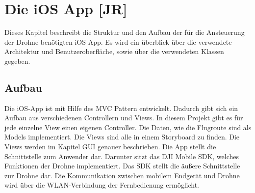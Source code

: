 
\chapter{Die iOS App [JR]}\label{cha:iOS App}

Dieses Kapitel beschreibt die Struktur und den Aufbau der für die Ansteuerung der Drohne benötigten iOS App. Es wird ein überblick über die verwendete Architektur und Benutzeroberfläche, sowie über die verwendeten Klassen gegeben.

\section{Aufbau}
Die iOS-App ist mit Hilfe des \acs{MVC} Pattern entwickelt. Dadurch gibt sich ein Aufbau aus verschiedenen Controllern und Views. In diesem Projekt gibt es für jede einzelne View einen eigenen Controller. Die Daten, wie die Flugroute sind als Models implementiert. 
\newline
Die Views sind alle in einem Storyboard zu finden. Die Views werden im Kapitel \acs{GUI} genauer beschrieben. 
\newline
Die App stellt die Schnittstelle zum Anwender dar. Darunter sitzt das DJI Mobile SDK, welches Funktionen der Drohne implementiert. Das \acs{SDK} stellt die äußere Schnittstelle zur Drohne dar.
\newline Die Kommunikation zwischen mobilem Endgerät und Drohne wird über die WLAN-Verbindung der Fernbedienung ermöglicht. 

